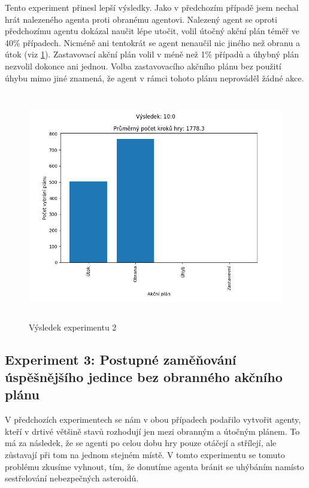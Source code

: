 Tento experiment přinesl lepší výsledky. Jako v předchozím případě jsem nechal hrát nalezeného agenta proti obranému agentovi.
Nalezený agent se oproti předchozímu agentu dokázal naučit lépe utočit, volil útočný akční plán téměř ve 40\% případech. 
Nicméně ani tentokrát se agent nenaučil nic jiného než obranu a útok (viz \ref{Výsledek experimentu 02}). 
Zastavovací akční plán volil v méně než 1\% případů a úhybný plán nezvolil dokonce ani jednou. Volba zastavovacího akčního plánu bez použití úhybu mimo jiné znamená, že agent v rámci tohoto plánu neprováděl žádné akce.
\newpage

 


\begin{figure}[p]\centering
\includegraphics[width=125mm, height=100mm]{./Obrazky/Experiment02Results.png}
\caption{Výsledek experimentu 2}
\label{Výsledek experimentu 02}
\end{figure}

\subsection{Experiment 3: Postupné zaměňování úspěšnějšího jedince bez obranného akčního plánu}

V předchozích experimentech se nám v obou případech podařilo vytvořit agenty, kteří v drtivé většině stavů rozhodují jen mezi obranným a útočným plánem.
To má za následek, že se agenti po celou dobu hry pouze otáčejí a střílejí, ale zůstavají při tom na jednom stejném místě.
V tomto experimentu se tomuto problému zkusíme vyhnout, tím, že donutíme agenta bránit se uhýbáním namísto sestřelování nebezpečných asteroidů.

